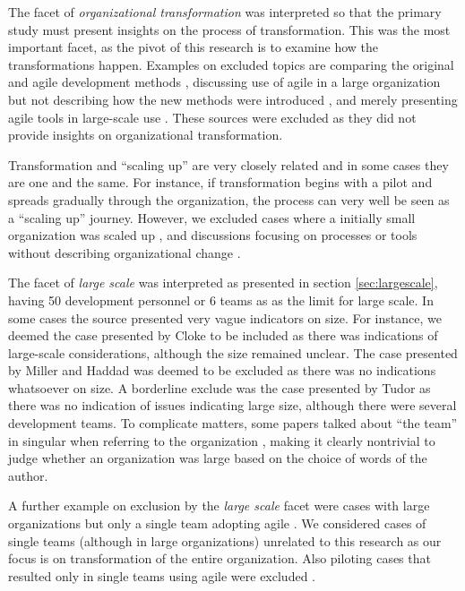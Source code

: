 \documentclass[preprint,authoryear,12pt]{elsarticle}
\begin{document}
The facet of \emph{organizational transformation} was interpreted so that the
primary study must present insights on the process of transformation. This
was the most important facet, as the pivot of this research is to examine
how the transformations happen. Examples on excluded topics are comparing the
original and agile development methods \cite{Petersen2010}, discussing use of
agile in a large organization but not describing how the new methods were
introduced \cite{Mishra2011}, and merely presenting agile tools in large-scale
use \cite{Kim2012}. These sources were excluded as they did not provide insights
on organizational transformation.

Transformation and ``scaling up'' are very closely related and in some cases
they are one and the same. For instance, if transformation begins with a pilot
and spreads gradually through the organization, the process can very well be
seen as a ``scaling up'' journey. However, we excluded cases where a initially
small organization was scaled up \cite{Maranzato2012}, and discussions focusing
on processes or tools without describing organizational change \cite{Lyon2008}.

The facet of \emph{large scale} was interpreted as presented in section
\ref{sec:largescale}, having 50 development personnel or 6 teams as as the limit
for large scale. In some cases the source presented very vague indicators on
size. For instance, we deemed the case presented by Cloke \cite{Cloke2007} to be
included as there was indications of large-scale considerations, although the
size remained unclear. The case presented by Miller and Haddad \cite{Miller2012}
was deemed to be excluded as there was no indications whatsoever on size. A
borderline exclude was the case presented by Tudor \cite{Tudor2006} as there was
no indication of issues indicating large size, although there were several
development teams.
To complicate matters, some papers talked about ``the team'' in singular when
referring to the organization \cite{Hodgkins2007}, making it clearly nontrivial
to judge whether an organization was large based on the choice of words of the
author.

A further example on exclusion by the \emph{large scale} facet were cases with
large organizations but only a single team adopting agile \cite{Fulgham2011}.
We considered cases of single teams (although in large organizations) unrelated
to this research as our focus is on transformation of the entire organization.
Also piloting cases that resulted only in single teams using agile were excluded
\cite{Scott2008}.
\end{document}
